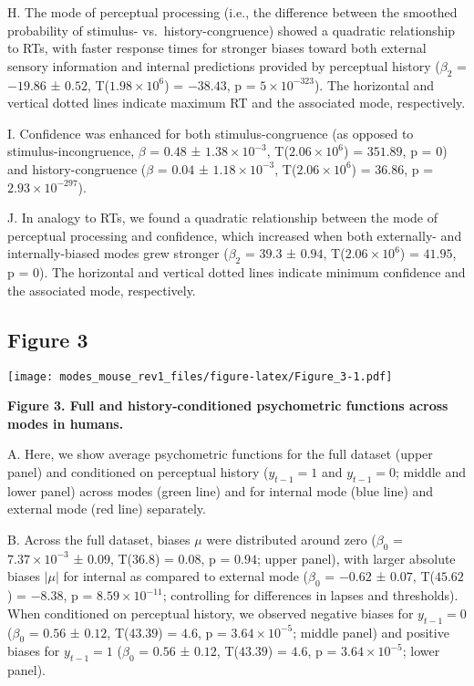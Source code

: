 \documentclass[
]{article}
\begin{document}
H. The mode of perceptual processing (i.e., the difference between the
smoothed probability of stimulus- vs.~history-congruence) showed a
quadratic relationship to RTs, with faster response times for stronger
biases toward both external sensory information and internal predictions
provided by perceptual history (\(\beta_2\) = \(-19.86\) ± \(0.52\),
T(\(\ensuremath{1.98\times 10^{6}}\)) = \(-38.43\), p =
\(\ensuremath{5\times 10^{-323}}\)). The horizontal and vertical dotted
lines indicate maximum RT and the associated mode, respectively.

I. Confidence was enhanced for both stimulus-congruence (as opposed to
stimulus-incongruence, \(\beta\) = \(0.48\) ±
\(\ensuremath{1.38\times 10^{-3}}\),
T(\(\ensuremath{2.06\times 10^{6}}\)) = \(351.89\), p = \(0\)) and
history-congruence (\(\beta\) = \(0.04\) ±
\(\ensuremath{1.18\times 10^{-3}}\),
T(\(\ensuremath{2.06\times 10^{6}}\)) = \(36.86\), p =
\(\ensuremath{2.93\times 10^{-297}}\)).

J. In analogy to RTs, we found a quadratic relationship between the mode
of perceptual processing and confidence, which increased when both
externally- and internally-biased modes grew stronger (\(\beta_2\) =
\(39.3\) ± \(0.94\), T(\(\ensuremath{2.06\times 10^{6}}\)) = \(41.95\),
p = \(0\)). The horizontal and vertical dotted lines indicate minimum
confidence and the associated mode, respectively.

\newpage

\hypertarget{figure-3}{%
\subsection{Figure 3}\label{figure-3}}

\texttt{[image: modes\_mouse\_rev1\_files/figure-latex/Figure\_3-1.pdf]}

\textbf{Figure 3. Full and history-conditioned psychometric functions
across modes in humans.}

A. Here, we show average psychometric functions for the full dataset
(upper panel) and conditioned on perceptual history (\(y_{t-1} = 1\) and
\(y_{t-1} = 0\); middle and lower panel) across modes (green line) and
for internal mode (blue line) and external mode (red line) separately.

B. Across the full dataset, biases \(\mu\) were distributed around zero
(\(\beta_0\) = \(\ensuremath{7.37\times 10^{-3}}\) ± \(0.09\),
T(\(36.8\)) = \(0.08\), p = \(0.94\); upper panel), with larger absolute
biases \(|\mu|\) for internal as compared to external mode (\(\beta_0\)
= \(-0.62\) ± \(0.07\), T(\(45.62\)) = \(-8.38\), p =
\(\ensuremath{8.59\times 10^{-11}}\); controlling for differences in
lapses and thresholds). When conditioned on perceptual history, we
observed negative biases for \(y_{t-1} = 0\) (\(\beta_0\) = \(0.56\) ±
\(0.12\), T(\(43.39\)) = \(4.6\), p =
\(\ensuremath{3.64\times 10^{-5}}\); middle panel) and positive biases
for \(y_{t-1} = 1\) (\(\beta_0\) = \(0.56\) ± \(0.12\), T(\(43.39\)) =
\(4.6\), p = \(\ensuremath{3.64\times 10^{-5}}\); lower panel).
\end{document}
